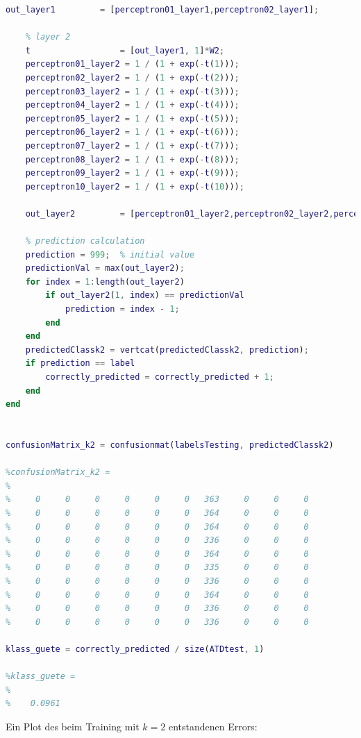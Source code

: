 \documentclass[12pt]{article}
\begin{document}
\begin{lstlisting}[language=Matlab]
    out_layer1         = [perceptron01_layer1,perceptron02_layer1];
    
    % layer 2
    t                  = [out_layer1, 1]*W2;
    perceptron01_layer2 = 1 / (1 + exp(-t(1)));
    perceptron02_layer2 = 1 / (1 + exp(-t(2)));
    perceptron03_layer2 = 1 / (1 + exp(-t(3)));
    perceptron04_layer2 = 1 / (1 + exp(-t(4)));
    perceptron05_layer2 = 1 / (1 + exp(-t(5)));
    perceptron06_layer2 = 1 / (1 + exp(-t(6)));
    perceptron07_layer2 = 1 / (1 + exp(-t(7)));
    perceptron08_layer2 = 1 / (1 + exp(-t(8)));
    perceptron09_layer2 = 1 / (1 + exp(-t(9)));
    perceptron10_layer2 = 1 / (1 + exp(-t(10)));
    
    out_layer2         = [perceptron01_layer2,perceptron02_layer2,perceptron03_layer2,perceptron04_layer2,perceptron05_layer2,perceptron06_layer2,perceptron07_layer2,perceptron08_layer2,perceptron09_layer2,perceptron10_layer2];
    
    % prediction calculation
    prediction = 999;  % initial value
    predictionVal = max(out_layer2);
    for index = 1:length(out_layer2)
        if out_layer2(1, index) == predictionVal
            prediction = index - 1;
        end
    end
    predictedClassk2 = vertcat(predictedClassk2, prediction);
    if prediction == label
        correctly_predicted = correctly_predicted + 1;
    end
end


confusionMatrix_k2 = confusionmat(labelsTesting, predictedClassk2)

%confusionMatrix_k2 =
%
%     0     0     0     0     0     0   363     0     0     0
%     0     0     0     0     0     0   364     0     0     0
%     0     0     0     0     0     0   364     0     0     0
%     0     0     0     0     0     0   336     0     0     0
%     0     0     0     0     0     0   364     0     0     0
%     0     0     0     0     0     0   335     0     0     0
%     0     0     0     0     0     0   336     0     0     0
%     0     0     0     0     0     0   364     0     0     0
%     0     0     0     0     0     0   336     0     0     0
%     0     0     0     0     0     0   336     0     0     0

klass_guete = correctly_predicted / size(ATDtest, 1)

%klass_guete =
%
%    0.0961

\end{lstlisting}
Ein Plot des beim Training mit $k = 2$ entstandenen Errors:\\
\end{document}
